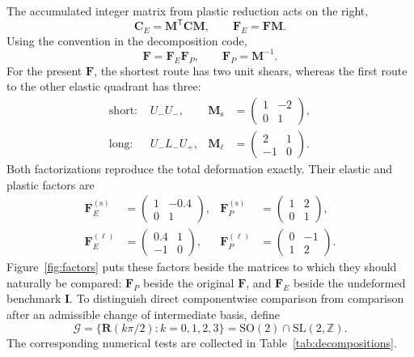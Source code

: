 \documentclass[11pt]{article}
\newcommand{\trans}{\mathsf{T}}
\newcommand{\shortp}{\mathrm{s}}
\newcommand{\longp}{\ell}
\newcommand{\SO}{\mathrm{SO}(2)}
\newcommand{\SLZ}{\mathrm{SL}(2,\mathbb{Z})}
\newcommand{\Uminus}{U_{-}}
\newcommand{\Lminus}{L_{-}}
\newcommand{\Uplus}{U_{+}}
\begin{document}
The accumulated integer matrix from plastic reduction acts on the right,
\begin{equation}
 \mathbf C_E=\mathbf M^\trans\mathbf C\mathbf M,
 \qquad
 \mathbf F_E=\mathbf F\mathbf M.
\end{equation}
Using the convention in the decomposition code,
\begin{equation}
 \boxed{
 \mathbf F=\mathbf F_E\mathbf F_P,
 \qquad
 \mathbf F_P=\mathbf M^{-1}.}
 \label{eq:decomposition}
\end{equation}
For the present \(\mathbf F\), the shortest route has two unit shears,
whereas the first route to the other elastic quadrant has three:
\begin{align}
 \text{short: }&\Uminus\Uminus,
 &\mathbf M_{\shortp}&=
 \begin{pmatrix}1&-2\\0&1\end{pmatrix},
 \\
 \text{long: }&\Uminus\Lminus\Uplus,
 &\mathbf M_{\longp}&=
 \begin{pmatrix}2&1\\-1&0\end{pmatrix}.
\end{align}
Both factorizations reproduce the total deformation exactly.  Their elastic
and plastic factors are
\begin{align}
 \mathbf F_E^{(\shortp)}&=
 \begin{pmatrix}1&-0.4\\0&1\end{pmatrix},
 &
 \mathbf F_P^{(\shortp)}&=
 \begin{pmatrix}1&2\\0&1\end{pmatrix},
 \\
 \mathbf F_E^{(\longp)}&=
 \begin{pmatrix}0.4&1\\-1&0\end{pmatrix},
 &
 \mathbf F_P^{(\longp)}&=
 \begin{pmatrix}0&-1\\1&2\end{pmatrix}.
\end{align}
Figure~\ref{fig:factors} puts these factors beside the matrices to which they
should naturally be compared: \(\mathbf F_P\) beside the original
\(\mathbf F\), and \(\mathbf F_E\) beside the undeformed benchmark
\(\mathbf I\).  To distinguish direct componentwise comparison from comparison
after an admissible change of intermediate basis, define
\begin{equation}
 \mathcal G=\{\mathbf R(k\pi/2):k=0,1,2,3\}
 =\SO\cap\SLZ.
 \label{eq:latticegroup}
\end{equation}
The corresponding numerical tests are collected in
Table~\ref{tab:decompositions}.
\end{document}

